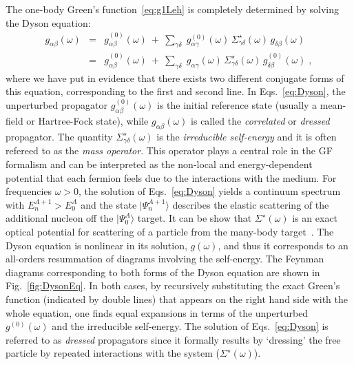 The one-body Green's function~\eqref{eq:g1Leh} is completely determined by solving the Dyson equation:
\begin{subequations}
\label{eq:Dyson}
\begin{eqnarray}
  \label{eq:Dyson_a}
  g_{\alpha\beta}(\omega)&=&g^{(0)}_{\alpha\beta}(\omega) ~+~ \sum_{\gamma\delta} \; g^{(0)}_{\alpha\gamma}(\omega) \, \Sigma_{\gamma\delta}^{\star}(\omega) \, g_{\delta\beta}(\omega) 
   \\   \label{eq:Dyson_b}
  &=&g^{(0)}_{\alpha\beta}(\omega) ~+~ \sum_{\gamma\delta} \; g_{\alpha\gamma}(\omega) \, \Sigma_{\gamma\delta}^{\star}(\omega) \, g^{(0)}_{\delta\beta}(\omega)  \; ,
\end{eqnarray}
\end{subequations}
where we have put in evidence that there exists two different conjugate forms of this equation, corresponding to the first and second line. 
In Eqs.~\eqref{eq:Dyson},  the unperturbed propagator $g^{(0)}_{\alpha\beta}(\omega)$ is the initial reference state (usually a mean-field or Hartree-Fock state), while $g_{\alpha\beta}(\omega)$ is called the {\em correlated} or {\em dressed} propagator. The quantity $\Sigma_{\gamma\delta}^{\star}(\omega)$ is the {\em irreducible self-energy}
and it is often refereed to as the {\em mass operator}.  This operator plays a central role in the GF formalism and can be interpreted as the 
non-local and energy-dependent potential that each fermion feels due to the interactions with the medium.  For frequencies $\omega>0$,  the solution of Eqs.~\eqref{eq:Dyson} yields a continuum spectrum with $E^{A+1}_n > E^A_0$ and the state $\vert\Psi^{A+1}_n\rangle$  describes the elastic scattering of the additional nucleon off the $\vert\Psi^A_0\rangle$ target. It can be show that $\Sigma^{\star}(\omega)$ is an exact optical potential for scattering of a particle  from the many-body target~\cite{ch11_MahauxSartor91,ch11_Capuzzi1996,ch11_Cederbaum2001}.
The Dyson equation is nonlinear in its solution, $g(\omega)$, and thus it corresponds to an all-orders resummation of diagrams involving the self-energy.
 The Feynman diagrams corresponding to both forms of the Dyson equation are shown in Fig.~\ref{fig:DysonEq}.
In both cases, by recursively substituting the exact Green's function (indicated by double lines) that appears on the right hand side with the whole equation, one finds equal expansions in terms of the unperturbed $g^{(0)}(\omega)$ and the irreducible self-energy. The solution of Eqs.~\eqref{eq:Dyson} is referred to as {\em dressed} propagators since it formally results by `dressing' the free particle by repeated interactions with the system ($\Sigma^{\star}(\omega)$).

